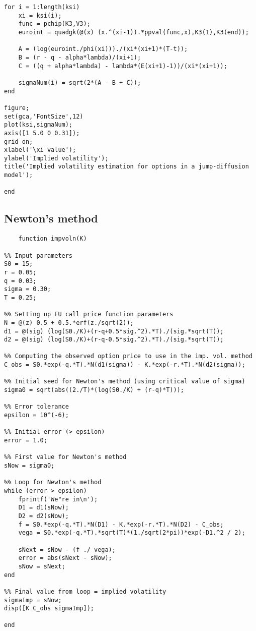 \begin{lstlisting}
for i = 1:length(ksi)
    xi = ksi(i);
    func = pchip(K3,V3);
    euroint = quadgk(@(x) (x.^(xi-1)).*ppval(func,x),K3(1),K3(end));
    
    A = (log(euroint./phi(xi)))./(xi*(xi+1)*(T-t));
    B = (r - q - alpha*lambda)/(xi+1);
    C = ((q + alpha*lambda) - lambda*(E(xi+1)-1))/(xi*(xi+1));
    
    sigmaNum(i) = sqrt(2*(A - B + C));
end

figure;
set(gca,'FontSize',12)
plot(ksi,sigmaNum);
axis([1 5.0 0 0.31]);
grid on;
xlabel('\xi value');
ylabel('Implied volatility');
title('Implied volatility estimation for options in a jump-diffusion model');

end

\end{lstlisting}

\subsection{Newton's method}
\begin{lstlisting}
    function impvoln(K)

%% Input parameters
S0 = 15;
r = 0.05;
q = 0.03;
sigma = 0.30;
T = 0.25;

%% Setting up EU call price function parameters
N = @(z) 0.5 + 0.5.*erf(z./sqrt(2));
d1 = @(sig) (log(S0./K)+(r-q+0.5*sig.^2).*T)./(sig.*sqrt(T));
d2 = @(sig) (log(S0./K)+(r-q-0.5*sig.^2).*T)./(sig.*sqrt(T));

%% Computing the observed option price to use in the imp. vol. method
C_obs = S0.*exp(-q.*T).*N(d1(sigma)) - K.*exp(-r.*T).*N(d2(sigma));

%% Initial seed for Newton's method (using critical value of sigma)
sigma0 = sqrt(abs((2./T)*(log(S0./K) + (r-q)*T)));

%% Error tolerance
epsilon = 10^(-6);

%% Initial error (> epsilon)
error = 1.0;

%% First value for Newton's method
sNow = sigma0;

%% Loop for Newton's method
while (error > epsilon)
    fprintf('We"re in\n');
    D1 = d1(sNow);
    D2 = d2(sNow);
    f = S0.*exp(-q.*T).*N(D1) - K.*exp(-r.*T).*N(D2) - C_obs;
    vega = S0.*exp(-q.*T).*sqrt(T)*(1./sqrt(2*pi))*exp(-D1.^2 / 2);
    
    sNext = sNow - (f ./ vega);
    error = abs(sNext - sNow);
    sNow = sNext;
end

%% Final value from loop = implied volatility
sigmaImp = sNow;
disp([K C_obs sigmaImp]);

end
\end{lstlisting}


